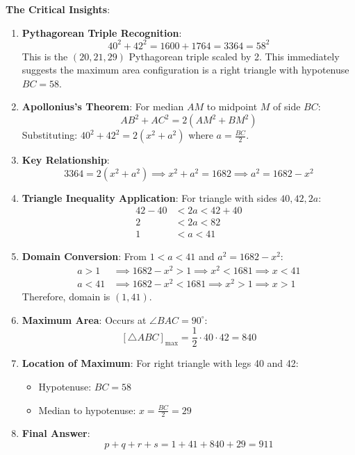 \documentclass[12pt]{article}
\begin{document}
\begin{keyinsightbox}
\textbf{The Critical Insights}:

\begin{enumerate}
    \item \textbf{Pythagorean Triple Recognition}: 
    $$40^2 + 42^2 = 1600 + 1764 = 3364 = 58^2$$
    This is the $(20, 21, 29)$ Pythagorean triple scaled by 2. This immediately suggests the maximum area configuration is a right triangle with hypotenuse $BC = 58$.
    
    \item \textbf{Apollonius's Theorem}: For median $AM$ to midpoint $M$ of side $BC$:
    $$AB^2 + AC^2 = 2(AM^2 + BM^2)$$
    Substituting: $40^2 + 42^2 = 2(x^2 + a^2)$ where $a = \frac{BC}{2}$.
    
    \item \textbf{Key Relationship}: 
    $$3364 = 2(x^2 + a^2) \implies x^2 + a^2 = 1682 \implies a^2 = 1682 - x^2$$
    
    \item \textbf{Triangle Inequality Application}: For triangle with sides $40, 42, 2a$:
    \begin{align*}
        42 - 40 &< 2a < 42 + 40 \\
        2 &< 2a < 82 \\
        1 &< a < 41
    \end{align*}
    
    \item \textbf{Domain Conversion}: From $1 < a < 41$ and $a^2 = 1682 - x^2$:
    \begin{align*}
        a > 1 &\implies 1682 - x^2 > 1 \implies x^2 < 1681 \implies x < 41 \\
        a < 41 &\implies 1682 - x^2 < 1681 \implies x^2 > 1 \implies x > 1
    \end{align*}
    Therefore, domain is $(1, 41)$.
    
    \item \textbf{Maximum Area}: Occurs at $\angle BAC = 90^{\circ}$:
    $$[\triangle ABC]_{\max} = \frac{1}{2} \cdot 40 \cdot 42 = 840$$
    
    \item \textbf{Location of Maximum}: For right triangle with legs 40 and 42:
    \begin{itemize}
        \item Hypotenuse: $BC = 58$
        \item Median to hypotenuse: $x = \frac{BC}{2} = 29$
    \end{itemize}
    
    \item \textbf{Final Answer}: 
    $$p + q + r + s = 1 + 41 + 840 + 29 = 911$$
\end{enumerate}
\end{keyinsightbox}
\end{document}
